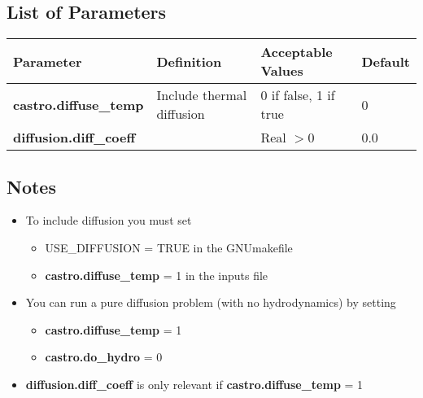 \subsection{List of Parameters}

\begin{table*}[h]
\begin{scriptsize}
\begin{center}
\begin{tabular}{|l|l|l|l|} \hline
Parameter & Definition & Acceptable Values &Default\\
\hline
{\bf castro.diffuse\_temp} & Include thermal diffusion & 0 if false, 1 if true & 0 \\
{\bf diffusion.diff\_coeff} & & Real $> 0$ & 0.0 \\
\hline
\end{tabular}
\label{Table:Diffusion}
\end{center}
\end{scriptsize}
\end{table*}

\subsection{Notes}
\begin{itemize}
\item To include diffusion you must set
\begin{itemize}
\item USE\_DIFFUSION  = TRUE in the GNUmakefile
\item {\bf castro.diffuse\_temp} = 1 in the inputs file
\end{itemize}
\item You can run a pure diffusion problem (with no hydrodynamics) by setting 
\begin{itemize}
\item {\bf castro.diffuse\_temp} = 1
\item {\bf castro.do\_hydro} = 0 
\end{itemize}
\item {\bf diffusion.diff\_coeff} is only relevant if {\bf castro.diffuse\_temp} = 1 
\end{itemize}


